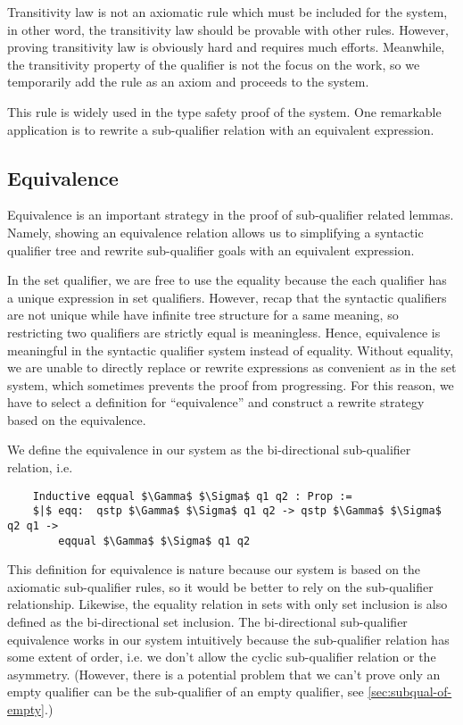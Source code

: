 Transitivity law is not an axiomatic rule which must be included for the system, in other word, the transitivity law should be provable with other rules. However, proving transitivity law is obviously hard and requires much efforts. Meanwhile, the transitivity property of the qualifier is not the focus on the work, so we temporarily add the rule as an axiom and proceeds to the \langstar system. 

This rule is widely used in the type safety proof of the \langstar system. One remarkable application is to rewrite a sub-qualifier relation with an equivalent expression.

\subsection{Equivalence}

Equivalence is an important strategy in the proof of sub-qualifier related lemmas. Namely, showing an equivalence relation allows us to simplifying a syntactic qualifier tree and rewrite sub-qualifier goals with an equivalent expression. 

In the set qualifier, we are free to use the equality because the each qualifier has a unique expression in set qualifiers. However, recap that the syntactic qualifiers are not unique while have infinite tree structure for a same meaning, so restricting two qualifiers are strictly equal is meaningless. Hence, equivalence is meaningful in the syntactic qualifier system instead of equality. Without equality, we are unable to directly replace or rewrite expressions as convenient as in the set system, which sometimes prevents the proof from progressing. For this reason, we have to select a definition for ``equivalence'' and construct a rewrite strategy based on the equivalence.

We define the equivalence in our system as the bi-directional sub-qualifier relation, i.e.
\begin{lstlisting}
    Inductive eqqual $\Gamma$ $\Sigma$ q1 q2 : Prop :=
    $|$ eqq:  qstp $\Gamma$ $\Sigma$ q1 q2 -> qstp $\Gamma$ $\Sigma$ q2 q1 ->
        eqqual $\Gamma$ $\Sigma$ q1 q2
\end{lstlisting}
This definition for equivalence is nature because our system is based on the axiomatic sub-qualifier rules, so it would be better to rely on the sub-qualifier relationship. Likewise, the equality relation in sets with only set inclusion is also defined as the bi-directional set inclusion. The bi-directional sub-qualifier equivalence works in our system intuitively because the sub-qualifier relation has some extent of order, i.e. we don't allow the cyclic sub-qualifier relation or the asymmetry. (However, there is a potential problem that we can't prove only an empty qualifier can be the sub-qualifier of an empty qualifier, see \ref{sec:subqual-of-empty}.)

